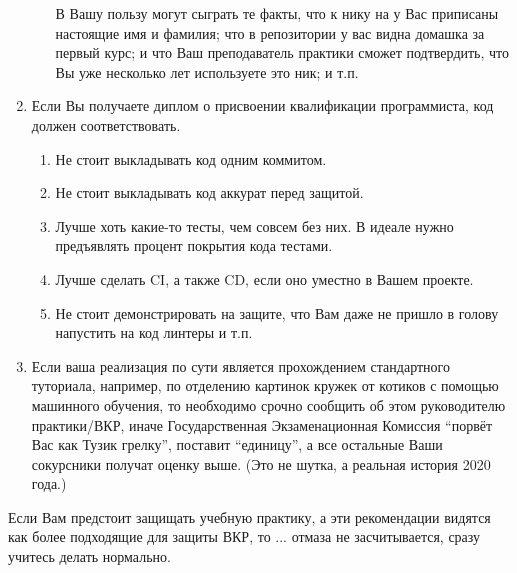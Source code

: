 \begin{enumerate}
\begin{itemize}
                    В Вашу пользу могут сыграть те факты, что к нику на \GitHub{} у Вас приписаны настоящие имя и фамилия; что в репозитории у вас видна домашка за первый курс;
                    и что Ваш преподаватель практики сможет подтвердить, что Вы уже несколько лет используете это ник; и т.п.
          \end{itemize}
    \item Если Вы получаете диплом о присвоении квалификации программиста, код должен соответствовать.
          \begin{enumerate}
              \item Не стоит выкладывать код одним коммитом.
              \item Не стоит выкладывать код аккурат перед защитой.
              \item Лучше хоть какие-то тесты, чем совсем без них.
                    В идеале нужно предъявлять процент покрытия кода тестами.
              \item Лучше сделать \textsc{CI}, а также \textsc{CD}, если оно уместно в Вашем проекте.
              \item Не стоит демонстрировать на защите, что Вам даже не пришло в голову напустить на код линтеры и т.п.
          \end{enumerate}
    \item Если ваша реализация по сути является прохождением стандартного туториала,
          например, по отделению картинок кружек от котиков с помощью машинного обучения, то необходимо срочно сообщить об этом руководителю практики/ВКР,
          иначе Государственная Экзаменацион\-ная Комиссия \enquote{порвёт Вас как Тузик грелку}, поставит \enquote{единицу},
          а все остальные Ваши сокурсники получат оценку выше.
          (Это не шутка, а реальная история 2020 года.)
\end{enumerate}

\noindent Если Вам предстоит защищать учебную практику, а эти рекомендации видятся как более подходящие для защиты ВКР, то ... отмаза не засчиты\-вается, сразу учитесь делать нормально.
